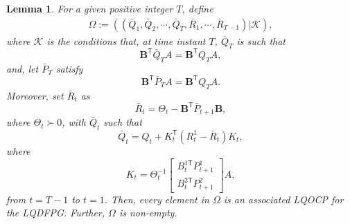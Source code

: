 \documentclass{article}
\newcommand{\transpose}{\mathsf{T}}
\newtheorem{lemma}{Lemma}
\begin{document}
\begin{lemma}
    \cite[Theorem 5]{prasad_structure_2023}
    For a given positive integer $T$, define
    \begin{align*}
        \Omega := ((\bar{Q}_{1},\bar{Q}_{2},\cdots,\bar{Q}_{T},\bar{R}_{1},\cdots,\bar{R}_{T-1})|\mathcal{K}),
    \end{align*}
    where $\mathcal{K}$ is the conditions that, at time instant $T$, $\bar{Q}_{T}$ is such that
        \begin{equation}
            \mathbf{B}^{\transpose}\bar{Q}_{T}A = \mathbf{B}^{\transpose}Q_{T}A,
        \end{equation}
        and, let $\bar{P}_{T}$ satisfy
        \begin{equation}
            \mathbf{B}^{\transpose}\bar{P}_{T}A = \mathbf{B}^{\transpose}Q_{T}A.
        \end{equation}
        Moreover, set $\bar{R}_{t}$ as
        \begin{equation}\label{eq:matrixR}
            \bar{R}_{t} = \Theta_{t} - \mathbf{B}^{\transpose}\bar{P}_{t+1}\mathbf{B},
        \end{equation}
        where $\Theta_{t} \succ 0$,
        with $\bar{Q}_{t}$ such that
        \begin{equation}
            \bar{Q}_{t} = Q_{t} + K_{t}^{\transpose}(R_{t}^{1}-\bar{R}_{t})K_{t},
        \end{equation}
        where
        \begin{equation}
            K_{t} = \Theta_{t}^{-1}
            \begin{bmatrix}
                B_{t}^{1\transpose}P_{t+1}^{1}\\
                B_{t}^{2\transpose}P_{t+1}^{2}
            \end{bmatrix}
            A,
        \end{equation}
        from $t=T-1$ to $t=1$.
    Then, every element in $\Omega$ is an associated LQOCP for the LQDFPG. Further, $\Omega$ is non-empty.
\end{lemma}
\end{document}
